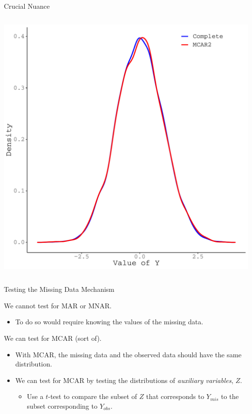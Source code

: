 \documentclass{beamer}\usepackage[]{graphicx}\usepackage[]{color}
\newenvironment{knitrout}{}{} %
\begin{document}
\begin{frame}{Crucial Nuance}
\begin{columns}
\begin{column}{0.5\textwidth}
\begin{knitrout}
{\centering \includegraphics[width=1\linewidth]{figure/intro-unnamed-chunk-19-1} 

}


\end{knitrout}
  
\end{column}
\end{columns}

\end{frame}

\watermarkon %

\begin{frame}{Testing the Missing Data Mechanism}
  
  We cannot test for MAR or MNAR.
  \begin{itemize}
  \item To do so would require knowing the values of the missing data.
  \end{itemize}
  \vb
  We can test for MCAR (sort of).
  \begin{itemize}
  \item With MCAR, the missing data and the observed data should have the same distribution.
  \item We can test for MCAR by testing the distributions of \emph{auxiliary variables}, $Z$.
    \begin{itemize}
      \item Use a $t$-test to compare the subset of $Z$ that corresponds to 
        $Y_{mis}$ to the subset corresponding to $Y_{obs}$.
    \end{itemize}
  \end{itemize}
  
\end{frame}
\end{document}

